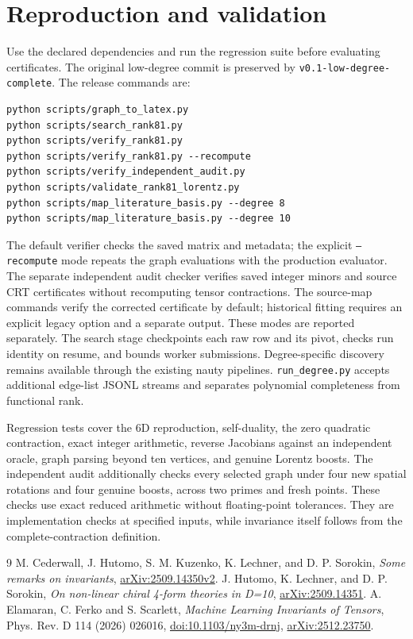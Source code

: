 \documentclass[11pt]{article}
\begin{document}
\section{Reproduction and validation}
Use the declared dependencies and run the regression suite before evaluating
certificates. The original low-degree commit is preserved by
\texttt{v0.1-low-degree-complete}. The release commands are:
\begin{verbatim}
python scripts/graph_to_latex.py
python scripts/search_rank81.py
python scripts/verify_rank81.py
python scripts/verify_rank81.py --recompute
python scripts/verify_independent_audit.py
python scripts/validate_rank81_lorentz.py
python scripts/map_literature_basis.py --degree 8
python scripts/map_literature_basis.py --degree 10
\end{verbatim}
The default verifier checks the saved matrix and metadata; the explicit
\texttt{--recompute} mode repeats the graph evaluations with the production
evaluator. The separate independent audit checker verifies saved integer
minors and source CRT certificates without recomputing tensor contractions.
The source-map commands verify the corrected certificate by default;
historical fitting requires an explicit legacy option and a separate output.
These modes are reported separately. The search stage checkpoints each raw row and its
pivot, checks run identity on resume, and bounds worker submissions.
Degree-specific discovery remains available through the existing nauty
pipelines. \texttt{run\_degree.py} accepts additional edge-list JSONL streams
and separates polynomial completeness from functional rank.

Regression tests cover the 6D reproduction, self-duality,
the zero quadratic contraction, exact integer arithmetic, reverse
Jacobians against an independent oracle, graph parsing beyond ten vertices,
and genuine Lorentz boosts. The independent audit additionally checks every
selected graph under four new spatial rotations and four genuine boosts,
across two primes and fresh points. These checks use exact reduced arithmetic
without floating-point tolerances. They are implementation checks at specified inputs,
while invariance itself follows from the complete-contraction definition.

\begin{thebibliography}{9}
 M. Cederwall, J. Hutomo, S. M. Kuzenko, K. Lechner,
and D. P. Sorokin, \emph{Some remarks on invariants},
\href{https://arxiv.org/abs/2509.14350v2}{arXiv:2509.14350v2}.
 J. Hutomo, K. Lechner, and D. P. Sorokin,
\emph{On non-linear chiral 4-form theories in D=10},
\href{https://arxiv.org/abs/2509.14351}{arXiv:2509.14351}.
 A. Elamaran, C. Ferko and S. Scarlett,
\emph{Machine Learning Invariants of Tensors}, Phys. Rev. D 114 (2026) 026016,
\href{https://doi.org/10.1103/ny3m-drnj}{doi:10.1103/ny3m-drnj},
\href{https://arxiv.org/abs/2512.23750}{arXiv:2512.23750}.
\end{thebibliography}
\end{document}
